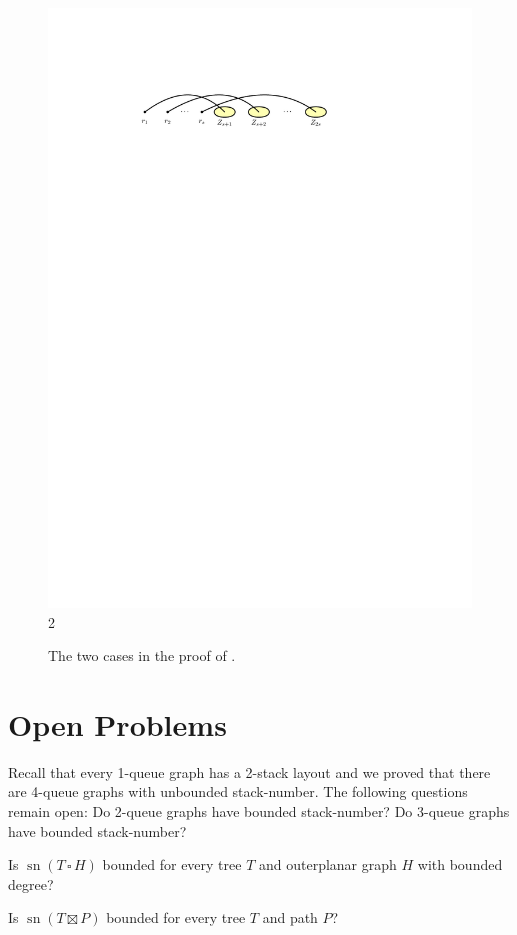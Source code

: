 \documentclass[kpfonts]{patmorin}
\DeclareMathOperator{\sn}{sn}
\newcommand{\CartProd}{\,\square\,}
\begin{document}
\begin{figure}
\begin{center}
		\includegraphics{figs/median-2} \\ 2
	\end{center}
	\caption{The two cases in the proof of .}
\end{figure}

\section{Open Problems}

Recall that every 1-queue graph has a 2-stack layout \citep{HLR92} and we proved that there are 4-queue graphs with unbounded stack-number. The following questions remain open: Do 2-queue graphs have bounded stack-number? Do 3-queue graphs have bounded stack-number?

Is $\sn(T \CartProd H)$ bounded for every tree $T$ and outerplanar graph $H$ with bounded degree?

Is $\sn(T \boxtimes P)$ bounded for every tree $T$ and path $P$?

%



\end{document}
